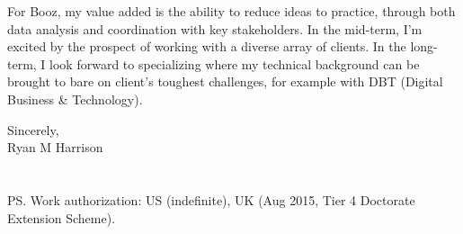 \documentclass{../res}
\begin{document}
\begin{sloppypar}
\begin{resume}
For Booz, my value added is the ability to reduce ideas to practice, through both data analysis and coordination with key stakeholders. In the mid-term, I'm excited by the prospect of working with a diverse array of clients. In the long-term, I look forward to specializing where my technical background can be brought to bare on client's toughest challenges, for example with DBT (Digital Business \& Technology).

\vspace{1\baselineskip}
Sincerely,
\\
Ryan M Harrison \\ \\ \\
PS. Work authorization: US (indefinite), UK (Aug 2015, Tier 4 Doctorate Extension Scheme).

\end{resume} 
\end{sloppypar}
\end{document}
